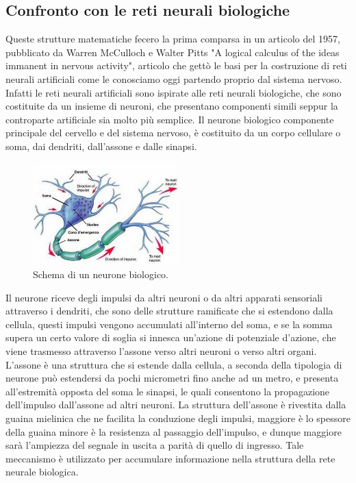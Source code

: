 \subsection{Confronto con le reti neurali biologiche}

Queste strutture matematiche fecero la prima comparsa in un articolo del 1957, pubblicato da Warren McCulloch e Walter Pitts
"A logical calculus of the ideas immanent in nervous activity", articolo che gettò le basi per la costruzione di reti neurali artificiali
come le conosciamo oggi partendo proprio dal sistema nervoso.
Infatti le reti neurali artificiali sono ispirate alle reti neurali biologiche, che sono costituite da un insieme di neuroni,
che presentano componenti simili seppur la controparte artificiale sia molto più semplice.
Il neurone biologico componente principale del cervello e del sistema nervoso, è costituito da un corpo cellulare o soma, dai dendriti, 
dall'assone e dalle sinapsi.

    \begin{figure}[H]
        \centering
        \includegraphics[width=0.5\textwidth]{imgs/neurone.jpg}
        \caption{Schema di un neurone biologico.}
        \label{fig:neuron_bio}
    \end{figure}

Il neurone riceve degli impulsi da altri neuroni o da altri apparati sensoriali attraverso i dendriti, che sono delle strutture ramificate
che si estendono dalla cellula, questi impulsi vengono accumulati all'interno del soma, e se la somma supera un certo valore di soglia
si innesca un'azione di potenziale d'azione, che viene trasmesso attraverso l'assone verso altri neuroni o verso altri organi.
L'assone è una struttura che si estende dalla cellula, a seconda della tipologia di neurone può estendersi da pochi micrometri fino anche ad un metro,
e presenta all'estremità opposta del soma le sinapsi, le quali consentono la propagazione dell'impulso dall'assone ad altri neuroni.
La struttura dell'assone è rivestita dalla guaina mielinica che ne facilita la conduzione degli impulsi, maggiore è lo spessore della guaina
minore è la resistenza al passaggio dell'impulso, e dunque maggiore sarà l'ampiezza del segnale in uscita a parità di quello di ingresso. 
Tale meccanismo è utilizzato per accumulare informazione nella struttura della rete neurale biologica.

